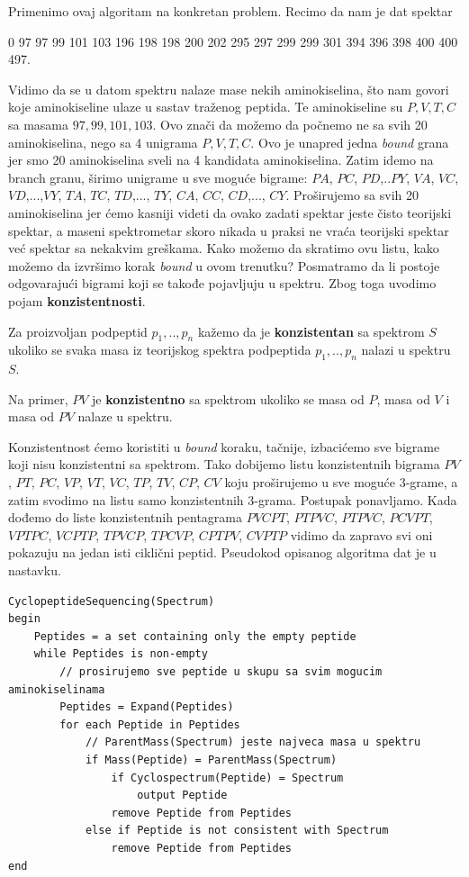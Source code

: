 \fi 

Primenimo ovaj algoritam na konkretan problem. Recimo da nam je dat spektar
\begin{center}
 0 97 97 99 101 103 196 198 198 200 202 295 297 299 299 301 394 396 398 400 400 497.
 \end{center} 
\noindent  Vidimo da se u datom spektru nalaze mase nekih aminokiselina, što nam govori koje aminokiseline ulaze u sastav traženog peptida. Te aminokiseline su $P,V,T,C$ sa masama $97,99, 101, 103$. Ovo znači da možemo da počnemo ne sa svih 20 aminokiselina, nego sa 4 unigrama $P,V,T,C$. Ovo je unapred jedna \textit{bound} grana jer smo 20 aminokiselina sveli na 4 kandidata aminokiselina. Zatim idemo na branch granu, širimo unigrame u sve moguće bigrame: $PA$, $PC$, $PD$,..$PY$, $VA$, $VC$, $VD$,...,$VY$, $TA$, $TC$, $TD$,..., $TY$, $CA$, $CC$, $CD$,..., $CY$. Proširujemo sa svih 20 aminokiselina jer ćemo kasniji videti da ovako zadati spektar jeste čisto teorijski spektar, a maseni spektrometar skoro nikada u praksi ne vraća teorijski spektar već spektar sa nekakvim greškama. Kako možemo da skratimo ovu listu, kako možemo da izvršimo korak \textit{bound} u ovom trenutku? Posmatramo da li postoje odgovarajući bigrami koji se takođe pojavljuju u spektru. Zbog toga uvodimo pojam \textbf{konzistentnosti}.

\begin{definicija}
Za proizvoljan podpeptid $p_{1},..,p_{n}$ kažemo da je \textbf{konzistentan} sa spektrom $S$ ukoliko se svaka masa iz teorijskog spektra podpeptida  $p_{1},..,p_{n}$ nalazi u spektru $S$.
\end{definicija}

Na primer, $PV$ je \textbf{konzistentno} sa spektrom ukoliko se masa od $P$, masa od $V$ i masa od $PV$ nalaze u spektru.

Konzistentnost ćemo koristiti u \textit{bound} koraku, tačnije, izbacićemo sve bigrame koji nisu konzistentni sa spektrom. Tako dobijemo listu konzistentnih bigrama $PV$, $PT$, $PC$, $VP$, $VT$, $VC$, $TP$, $TV$, $CP$, $CV$ koju proširujemo u sve moguće $3$-grame, a zatim svodimo na listu samo konzistentnih $3$-grama. Postupak ponavljamo. Kada dođemo do liste konzistentnih pentagrama $PVCPT$, $PTPVC$, $PTPVC$, $PCVPT$, $VPTPC$, $VCPTP$, $TPVCP$, $TPCVP$, $CPTPV$, $CVPTP$ vidimo da zapravo svi oni pokazuju na jedan isti ciklični peptid. Pseudokod opisanog algoritma dat je u nastavku.
\begin{lstlisting}
CyclopeptideSequencing(Spectrum)
begin
	Peptides = a set containing only the empty peptide
	while Peptides is non-empty
		// prosirujemo sve peptide u skupu sa svim mogucim aminokiselinama
		Peptides = Expand(Peptides)
		for each Peptide in Peptides
			// ParentMass(Spectrum) jeste najveca masa u spektru
			if Mass(Peptide) = ParentMass(Spectrum)
				if Cyclospectrum(Peptide) = Spectrum
					output Peptide
				remove Peptide from Peptides
			else if Peptide is not consistent with Spectrum
				remove Peptide from Peptides
end
\end{lstlisting}

